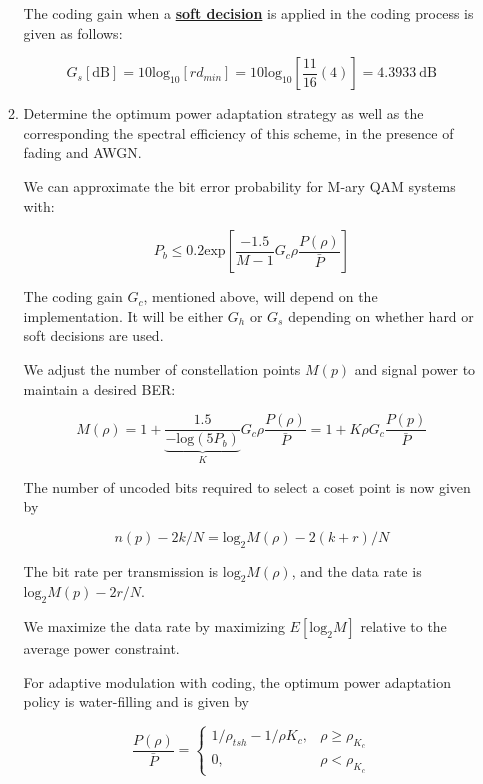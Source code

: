 \documentclass[fleqn]{article}
\begin{document}
\begin{enumerate}
\begin{enumerate}
			The coding gain when a \textbf{\underline{soft decision}} is applied in the coding process is given as follows:
			
			\begin{equation*}
				G_s[\text{dB}] = 10\text{log}_{10}[rd_{min}] = 10\text{log}_{10}\left[\frac{11}{16}(4)\right] = 4.3933 \ \text{dB}
			\end{equation*}
			
			\item Determine the optimum power adaptation strategy as well as the corresponding the spectral efficiency of this scheme, in the presence of fading and AWGN.
			
			We can approximate the bit error probability for M-ary QAM systems with:
			
			\begin{equation*}
				P_b \leq 0.2\text{exp}\left[\frac{-1.5}{M-1}G_c\rho\frac{P(\rho)}{\bar{P}}\right]
			\end{equation*}
			
			The coding gain $G_c$, mentioned above, will depend on the implementation. It will be either $G_h$ or $G_s$ depending on whether hard or soft decisions are used.
			
			We adjust the number of constellation points $M(p)$ and signal power to maintain a desired BER:
			
			\begin{equation*}
				M(\rho) = 1 + \underbrace{\frac{1.5}{-\text{log}(5P_b)}}_{K}G_c\rho\frac{P(\rho)}{\bar{P}} = 1 + K\rho G_c\frac{P(p)}{\bar{P}}
			\end{equation*}
			
			The number of uncoded bits required to select a coset point is now given by
			
			\begin{equation*}
				n(p) - 2k/N = \text{log}_2{M(\rho)} - 2(k+r)/N
			\end{equation*}
			
			The bit rate per transmission is $\text{log}_2M(\rho)$, and the data rate is $\text{log}_2M(p)-2r/N$.
			
			We maximize the data rate by maximizing $E[\text{log}_2{M}]$ relative to the average power constraint.
			
			For adaptive modulation with coding, the optimum power adaptation policy is water-filling and is given by
			
			\begin{equation*}
				\frac{P(\rho)}{\bar{P}} = \begin{cases}
					1/\rho_{tsh} - 1/\rho K_c, & \rho \geq \rho_{K_c}\\
					0, & \rho < \rho_{K_c}
				\end{cases}
			\end{equation*}
			

\end{enumerate}
\end{enumerate}
\end{document}
